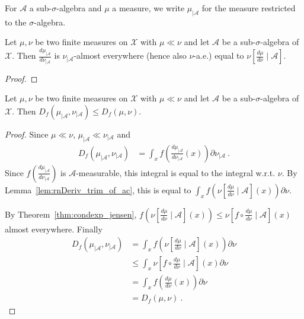 For $\mathcal A$ a sub-$\sigma$-algebra and $\mu$ a measure, we write $\mathcal \mu_{| \mathcal A}$ for the measure restricted to the $\sigma$-algebra.

\begin{lemma}
  \label{lem:rnDeriv_trim_of_ac}
  \leanok
  Let $\mu, \nu$ be two finite measures on $\mathcal X$ with $\mu \ll \nu$ and let $\mathcal A$ be a sub-$\sigma$-algebra of $\mathcal X$.
  Then $\frac{d \mu_{| \mathcal A}}{d \nu_{| \mathcal A}}$ is $\nu_{| \mathcal A}$-almost everywhere (hence also $\nu$-a.e.) equal to $\nu\left[ \frac{d \mu}{d \nu} \mid \mathcal A\right]$.
\end{lemma}

\begin{proof}\leanok
\end{proof}

\begin{lemma}
  \label{lem:fDiv_trim_le_of_ac}
  \leanok
  Let $\mu, \nu$ be two finite measures on $\mathcal X$ with $\mu \ll \nu$ and let $\mathcal A$ be a sub-$\sigma$-algebra of $\mathcal X$. Then
  $D_f(\mu_{| \mathcal A}, \nu_{| \mathcal A}) \le D_f(\mu, \nu)$.
\end{lemma}

\begin{proof}\leanok
{}
Since $\mu \ll \nu$, $\mu_{| \mathcal A} \ll \nu_{| \mathcal A}$ and
\begin{align*}
D_f(\mu_{| \mathcal A}, \nu_{| \mathcal A})
&= \int_x f \left( \frac{d \mu_{| \mathcal A}}{d \nu_{| \mathcal A}}(x) \right) \partial\nu_{| \mathcal A} \: .
\end{align*}
Since $f \left( \frac{d \mu_{| \mathcal A}}{d \nu_{| \mathcal A}} \right)$ is $\mathcal A$-measurable, this integral is equal to the integral w.r.t. $\nu$.
By Lemma~\ref{lem:rnDeriv_trim_of_ac}, this is equal to $\int_x f \left( \nu\left[ \frac{d \mu}{d \nu} \mid \mathcal A\right] (x) \right) \partial\nu$.

By Theorem~\ref{thm:condexp_jensen}, $f \left( \nu\left[ \frac{d \mu}{d \nu} \mid \mathcal A\right] (x) \right) \le \nu\left[ f \circ \frac{d \mu}{d \nu} \mid \mathcal A\right] (x)$ almost everywhere.
Finally
\begin{align*}
D_f(\mu_{| \mathcal A}, \nu_{| \mathcal A})
&= \int_x f \left( \nu\left[ \frac{d \mu}{d \nu} \mid \mathcal A\right] (x) \right) \partial\nu
\\
&\le \int_x \nu\left[ f \circ \frac{d \mu}{d \nu} \mid \mathcal A\right] (x) \partial\nu
\\
&= \int_x f \left( \frac{d \mu}{d \nu} (x) \right) \partial\nu
\\
&= D_f(\mu, \nu)
\: .
\end{align*}

\end{proof}

